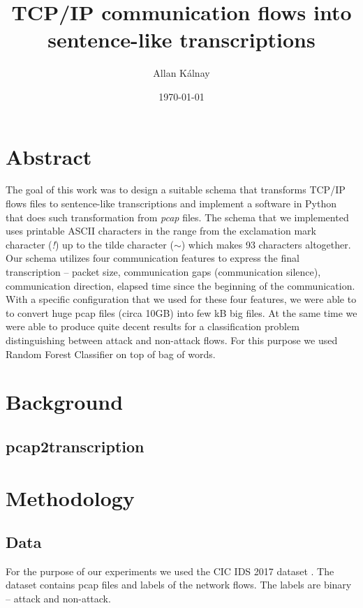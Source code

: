 \documentclass{article}
\title{TCP/IP communication flows into sentence-like transcriptions}
\author{Allan Kálnay}
\date{\today}
\begin{document}
\maketitle

\section*{Abstract}
The goal of this work was to design a suitable schema that transforms TCP/IP flows files to sentence-like transcriptions and implement a software in Python that does such transformation from \textit{pcap} files. The schema that we implemented uses printable ASCII characters in the range from the exclamation mark character (\textit{!}) up to the tilde character (\textit{$\sim$}) which makes 93 characters altogether. Our schema utilizes four communication features to express the final transcription -- packet size, communication gaps (communication silence), communication direction, elapsed time since the beginning of the communication. With a specific configuration that we used for these four features, we were able to to convert huge pcap files (circa 10GB) into few kB big files. At the same time we were able to produce quite decent results for a classification problem distinguishing between attack and non-attack flows. For this purpose we used Random Forest Classifier on top of bag of words.

\newpage
\tableofcontents
\newpage

\section{Background}
\subsection{pcap2transcription}

\section{Methodology}
\subsection{Data}
For the purpose of our experiments we used the CIC IDS 2017 dataset \cite{cic-ids-dataset}. The dataset contains pcap files and labels of the network flows. The labels are binary -- attack and non-attack.
\end{document}
